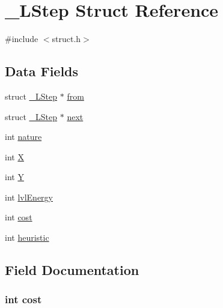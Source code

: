\hypertarget{struct___l_step}{}\section{\+\_\+\+L\+Step Struct Reference}
\label{struct___l_step}


{\ttfamily \#include $<$struct.\+h$>$}

\subsection*{Data Fields}
\begin{DoxyCompactItemize}
\item 
struct \hyperlink{struct___l_step}{\+\_\+\+L\+Step} $\ast$ \hyperlink{struct___l_step_ac26cd8182373efaf743f0afc78124c9c}{from}
\item 
struct \hyperlink{struct___l_step}{\+\_\+\+L\+Step} $\ast$ \hyperlink{struct___l_step_aec049652ca71b0108f37877e247b710c}{next}
\item 
int \hyperlink{struct___l_step_a7e11726fa8adbf489710249a6685d939}{nature}
\item 
int \hyperlink{struct___l_step_a80c0944640e62d3ed6c5419c1bcc0c88}{X}
\item 
int \hyperlink{struct___l_step_aa482c4cc86a24474e4fb19b5b5978778}{Y}
\item 
int \hyperlink{struct___l_step_a28708c211dc7281c07d30444d75e5e7c}{lvl\+Energy}
\item 
int \hyperlink{struct___l_step_a66700f11d42fee2413e58dbf49c43ee1}{cost}
\item 
int \hyperlink{struct___l_step_a266b59afb2a9e30cb84c2b14388fb5fe}{heuristic}
\end{DoxyCompactItemize}


\subsection{Field Documentation}
\subsubsection[{\texorpdfstring{cost}{cost}}]{\setlength{\rightskip}{0pt plus 5cm}int cost}\hypertarget{struct___l_step_a66700f11d42fee2413e58dbf49c43ee1}{}\label{struct___l_step_a66700f11d42fee2413e58dbf49c43ee1}
